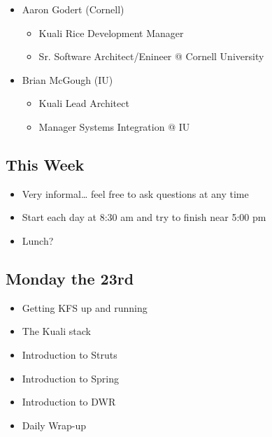 \documentclass[12pt,notitlepage]{article}
\begin{document}
\begin{s5presentation}
\begin{s5slide}
\begin{ifhtml}
\begin{itemize}
\begin{itemize}
              \item Primary focus: Kuali, Portal, Workflow, Integration, Training, Java Environment Support and general R\&D
              \end{itemize}
          \item Aaron Godert (Cornell)
              \begin{itemize}
              \item Kuali Rice Development Manager
              \item Sr. Software Architect/Enineer @ Cornell University
              \end{itemize}
          \item Brian McGough (IU)
                \begin{itemize}
                \item Kuali Lead Architect
                \item Manager Systems Integration @ IU
                \end{itemize}
        \end{itemize}
      \end{ifhtml} 
    \W \end{s5slide}
    \W \begin{s5slide}
        \W \section{This Week}
        \begin{ifhtml}
            \begin{itemize}
                \item Very informal… feel free to ask questions at any time
                \item Start each day at 8:30 am and try to finish near 5:00 pm
                \item Lunch?
            \end{itemize}
            
        \end{ifhtml} 
    \W \end{s5slide}
    \W \begin{s5slide}
        \W \section{Monday the 23rd}
        \begin{ifhtml}
            \begin{itemize}
                \item Getting KFS up and running
                \item The Kuali stack
                \item Introduction to Struts
                \item Introduction to Spring
                \item Introduction to DWR
                \item Daily Wrap-up
            \end{itemize}
            

\end{ifhtml}
\end{s5slide}
\end{s5presentation}
\end{document}
